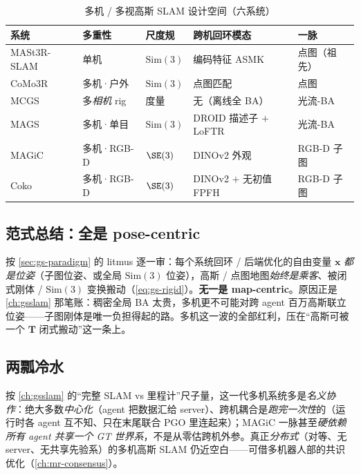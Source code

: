 \begin{table}[H]\centering
\caption{多机 / 多视高斯 SLAM 设计空间（六系统）}
\label{tab:mags-design}
\scriptsize
\begin{tabular}{@{}lllll@{}}
\toprule
系统 & 多重性 & 尺度规 & 跨机回环模态 & 一脉 \\
\midrule
MASt3R-SLAM & 单机 & $\mathrm{Sim}(3)$ & 编码特征 ASMK & 点图（祖先）\\
CoMo3R & 多机·户外 & $\mathrm{Sim}(3)$ & 点图匹配 & 点图 \\
MCGS & 多\emph{相机} rig & 度量 & 无（离线全 BA）& 光流-BA \\
MAGS & 多机·单目 & $\mathrm{Sim}(3)$ & DROID 描述子 $+$ LoFTR & 光流-BA \\
MAGiC & 多机·RGB-D & $\SE(3)$ & DINOv2 外观 & RGB-D 子图 \\
Coko & 多机·RGB-D & $\SE(3)$ & DINOv2 $+$ 无初值 FPFH & RGB-D 子图 \\
\bottomrule
\end{tabular}
\end{table}

\subsection{范式总结：全是 pose-centric}

\begin{insight}
按 \cref{sec:gs-paradigm} 的 litmus 逐一审：每个系统回环 / 后端优化的自由变量 $\mathbf x$ \emph{都是位姿}（子图位姿、或全局 $\mathrm{Sim}(3)$ 位姿），高斯 / 点图地图\emph{始终是乘客}、被闭式刚体 / $\mathrm{Sim}(3)$ 变换搬动（\cref{eq:gs-rigid}）。\textbf{无一是 map-centric}。原因正是 \cref{ch:gsslam} 那笔账：稠密全局 BA 太贵，多机更不可能对跨 agent 百万高斯联立位姿——子图刚体是唯一负担得起的路。多机这一波的全部红利，压在“高斯可被一个 $\mathbf T$ 闭式搬动”这一条上。
\end{insight}

\subsection{两瓢冷水}

\begin{insight}
按 \cref{ch:gsslam} 的“完整 SLAM vs 里程计”尺子量，这一代多机系统多是\emph{名义协作}：绝大多数\emph{中心化}（agent 把数据汇给 server）、跨机耦合是\emph{跑完一次性}的（运行时各 agent 互不知、只在末尾联合 PGO 里连起来）；MAGiC 一脉甚至\emph{硬依赖所有 agent 共享一个 GT 世界系}，不是从零估跨机外参。真正\emph{分布式}（对等、无 server、无共享先验系）的多机高斯 SLAM 仍近空白——可借多机器人部的共识优化（\cref{ch:mr-consensus}）。
\end{insight}

